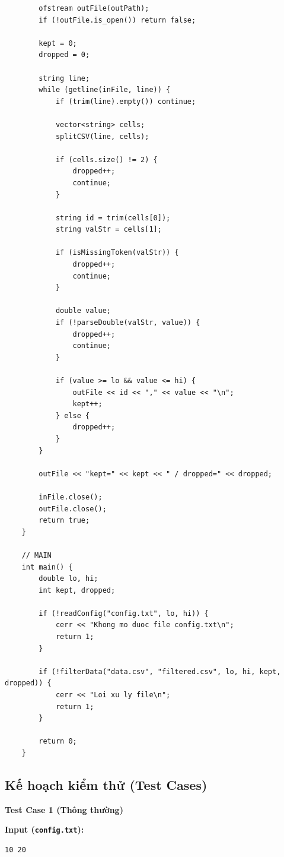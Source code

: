 \begin{lstlisting}
        ofstream outFile(outPath);
        if (!outFile.is_open()) return false;

        kept = 0;
        dropped = 0;

        string line;
        while (getline(inFile, line)) {
            if (trim(line).empty()) continue;

            vector<string> cells;
            splitCSV(line, cells);

            if (cells.size() != 2) {
                dropped++;
                continue;
            }

            string id = trim(cells[0]);
            string valStr = cells[1];

            if (isMissingToken(valStr)) {
                dropped++;
                continue;
            }

            double value;
            if (!parseDouble(valStr, value)) {
                dropped++;
                continue;
            }

            if (value >= lo && value <= hi) {
                outFile << id << "," << value << "\n";
                kept++;
            } else {
                dropped++;
            }
        }

        outFile << "kept=" << kept << " / dropped=" << dropped;

        inFile.close();
        outFile.close();
        return true;
    }

    // MAIN
    int main() {
        double lo, hi;
        int kept, dropped;

        if (!readConfig("config.txt", lo, hi)) {
            cerr << "Khong mo duoc file config.txt\n";
            return 1;
        }

        if (!filterData("data.csv", "filtered.csv", lo, hi, kept, dropped)) {
            cerr << "Loi xu ly file\n";
            return 1;
        }

        return 0;
    }
\end{lstlisting}

\subsection{Kế hoạch kiểm thử (Test Cases)}

\textbf{Test Case 1 (Thông thường)}

\textbf{Input (\texttt{config.txt}):}
\begin{lstlisting}
10 20
\end{lstlisting}

